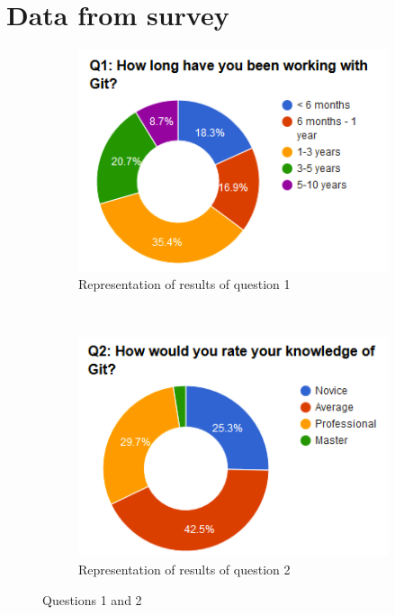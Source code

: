 \documentclass[a4paper,oneside]{bth} %
\begin{document}
		\chapter{Data from survey}
		\begin{figure}[H]
			\centering
			\begin{subfigure}[b]{0.45\textwidth}
				\includegraphics[width=\textwidth]{graphs/q1.png}
				\caption{Representation of results of question 1}
				\label{fig:q1}
			\end{subfigure}
			~
			\begin{subfigure}[b]{0.45\textwidth}
				\includegraphics[width=\textwidth]{graphs/q2.png}
				\caption{Representation of results of question 2}
				\label{fig:q2}
			\end{subfigure}
			\caption{Questions 1 and 2}\label{fig:q1-q2}
		\end{figure}
\end{document}
